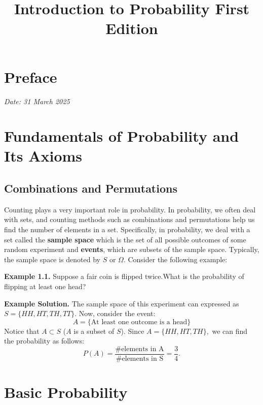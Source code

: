 \documentclass[
  12pt,
  krantz2]{krantzNoCorner}
\title{Introduction to Probability \newline First Edition}
\author{}
\date{\vspace{-2.5em}}
\begin{document}
\maketitle

{
\hypersetup{linkcolor=}
\setcounter{tocdepth}{2}
\tableofcontents
}
\hypertarget{preface}{%
\chapter*{Preface}\label{preface}}


\emph{Date: 31 March 2025}

\hypertarget{fundamentals-of-probability-and-its-axioms}{%
\chapter{Fundamentals of Probability and Its Axioms}\label{fundamentals-of-probability-and-its-axioms}}

\hypertarget{combinations-and-permutations}{%
\section{Combinations and Permutations}\label{combinations-and-permutations}}

Counting plays a very important role in probability. In probability, we often deal with sets, and counting methods such as combinations and permutations help us find the number of elements in a set. Specifically, in probability, we deal with a set called the \textbf{sample space} which is the set of all possible outcomes of some random experiment and \textbf{events}, which are subsets of the sample space. Typically, the sample space is denoted by \(S\) or \(\Omega.\) Consider the following example:

\textbf{Example 1.1.}
Suppose a fair coin is flipped twice.What is the probability of flipping at least one head?

\begin{graybox}
    \textbf{Example Solution.} The sample space of this experiment can expressed as $S=\{HH,HT,TH,TT\}$. Now, consider the event:
$$A=\{\text{At least one outcome is a head}\}$$
Notice that $A\subset S$ ($A$ is a subset of $S$). Since $A=\{HH,HT,TH\},$ we can find the probability as follows:
$$P(A)= \frac{\#\text{elements in A}}{\#\text{elements in S}}=\frac{3}{4}.$$
\end{graybox}

\hypertarget{basic-probability}{%
\chapter{Basic Probability}\label{basic-probability}}

  
\end{document}
